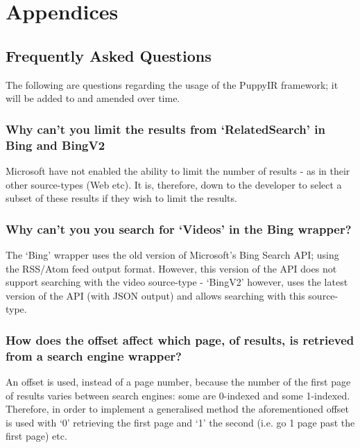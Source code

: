 \documentclass[letterpaper,10pt,english]{sphinxmanual}
\begin{document}
\chapter{Appendices}
\label{index:appendices}

\section{Frequently Asked Questions}
\label{faq:faq}\label{faq::doc}\label{faq:frequently-asked-questions}
The following are questions regarding the usage of the PuppyIR framework; it will be added to and amended over time.


\subsection{Why can't you limit the results from `RelatedSearch' in Bing and BingV2}
\label{faq:why-can-t-you-limit-the-results-from-relatedsearch-in-bing-and-bingv2}
Microsoft have not enabled the ability to limit the number of results - as in their other source-types (Web etc). It is, therefore, down to the developer to select a subset of these results if they wish to limit the results.


\subsection{Why can't you you search for `Videos' in the Bing wrapper?}
\label{faq:why-can-t-you-you-search-for-videos-in-the-bing-wrapper}
The `Bing' wrapper uses the old version of Microsoft's Bing Search API; using the RSS/Atom feed output format. However, this version of the API does not support searching with the video source-type - `BingV2' however, uses the latest version of the API (with JSON output) and allows searching with this source-type.


\subsection{How does the offset affect which page, of results, is retrieved from a search engine wrapper?}
\label{faq:how-does-the-offset-affect-which-page-of-results-is-retrieved-from-a-search-engine-wrapper}
An offset is used, instead of a page number, because the number of the first page of results varies between search engines: some are 0-indexed and some 1-indexed. Therefore, in order to implement a generalised method the aforementioned offset is used with `0' retrieving the first page and `1' the second (i.e. go 1 page past the first page) etc.
\end{document}
